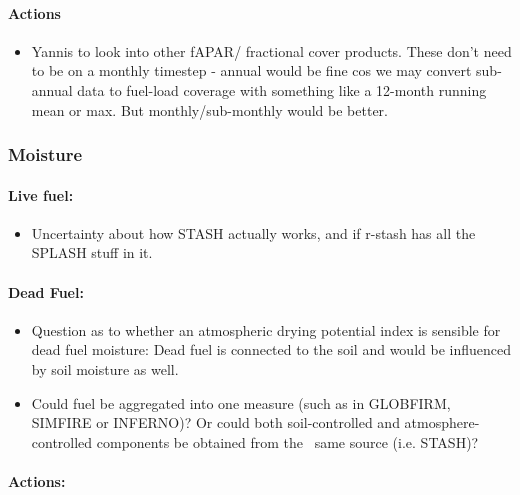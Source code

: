 \paragraph{Actions}

\begin{itemize}
\itemsep1pt\parskip0pt
\item
  Yannis to look into other fAPAR/ fractional cover products. These don't need to be on a monthly timestep - annual would be fine cos we may convert sub-annual data to fuel-load coverage with something like a 12-month running mean or max. But monthly/sub-monthly would be better.
\end{itemize}

\subsubsection{Moisture}

\paragraph{Live fuel:}

\begin{itemize}
\itemsep1pt\parskip0pt
\item
  Uncertainty about how STASH actually works, and if r-stash has all the SPLASH stuff in it.
\end{itemize}

\paragraph{Dead Fuel:}

\begin{itemize}
\itemsep1pt\parskip0pt
\item
  Question as to whether an atmospheric drying potential index is sensible for dead fuel moisture: Dead fuel is connected to the soil and would be influenced by soil moisture as well.
\item
  Could fuel be aggregated into one measure (such as in GLOBFIRM, SIMFIRE or INFERNO)? Or could both soil-controlled and atmosphere-controlled components be obtained from the ~same source (i.e. STASH)?
\end{itemize}

\paragraph{Actions:}

